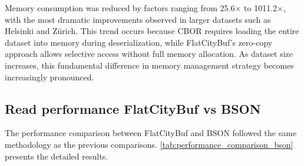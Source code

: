 Memory consumption was reduced by factors ranging from 25.6$\times$ to 1011.2$\times$, with the most dramatic improvements observed in larger datasets such as Helsinki and Zürich. This trend occurs because CBOR requires loading the entire dataset into memory during deserialization, while FlatCityBuf's zero-copy approach allows selective access without full memory allocation. As dataset size increases, this fundamental difference in memory management strategy becomes increasingly pronounced.

\subsection{Read performance FlatCityBuf vs BSON}
\label{result:benchmark_on_local_environment:read_performance_flatcitybuf_vs_bson}

The performance comparison between FlatCityBuf and BSON followed the same methodology as the previous comparisons. \autoref{tab:performance_comparison_bson} presents the detailed results.

